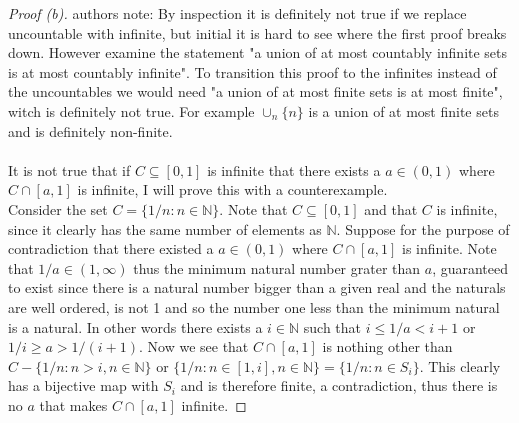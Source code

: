 \documentclass[12pt]{article}
\theoremstyle{homework}
\begin{document}
\begin{proof}[Proof (b)]
authors note:  By inspection it is definitely not true if we replace uncountable with infinite, but initial it is hard to see where the first proof breaks down.  However examine the statement "a union of at most countably infinite sets is at most countably infinite".  To transition this proof to the infinites instead of the uncountables we would need "a union of at most finite sets is at most finite", witch is definitely not true. For example $\cup_n \{n\}$ is a union of at most finite sets and is definitely non-finite.\\\\
It is not true that if $C\subseteq [0,1]$ is infinite that there exists a $a\in (0,1)$ where $C\cap [a,1]$ is infinite, I will prove this with a counterexample.\\
Consider the set $C=\{1/n:n\in\mathbb{N}\}$.  Note that $C\subseteq [0,1]$ and that $C$ is infinite, since it clearly has the same number of elements as $\mathbb{N}$.  Suppose for the purpose of contradiction that there existed a $a\in (0,1)$ where $C\cap [a,1]$ is infinite.  Note that $1/a\in (1,\infty)$ thus the minimum natural number grater than $a$, guaranteed to exist since there is a natural number bigger than a given real and the naturals are well ordered, is not 1 and so the number one less than the minimum natural is a natural.  In other words there exists a $i\in \mathbb{N}$ such that $i\leq 1/a< i+1$ or $1/i \geq a> 1/(i+1)$.  Now we see that $C\cap [a,1]$ is nothing other than $C-\{1/n:n>i,n\in \mathbb{N}\}$ or 
$\{1/n:n\in[1,i],n\in \mathbb{N}\}=\{1/n:n\in S_{i}\}$.  This clearly has a bijective map with $S_i$ and is therefore finite, a contradiction, thus there is no $a$ that makes $C\cap [a,1]$ infinite.
\end{proof}
\end{document}
